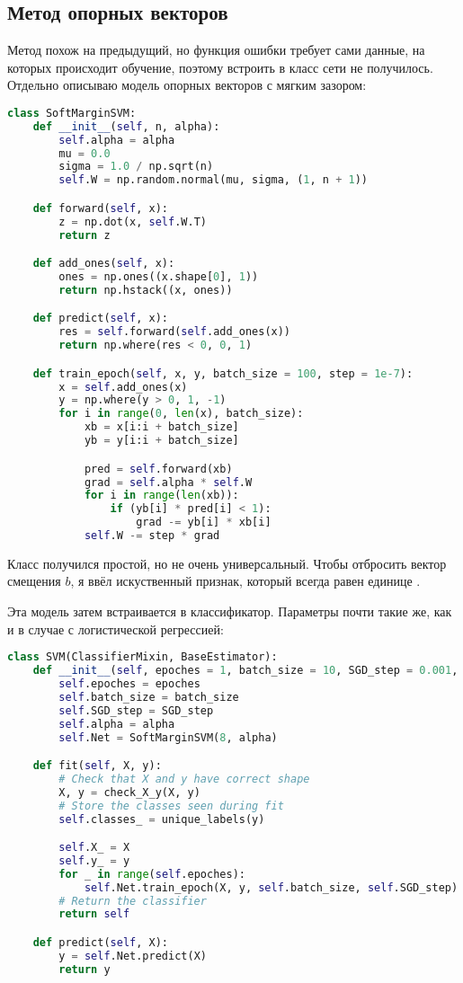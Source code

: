 \subsection{Метод опорных векторов}
Метод похож на предыдущий, но функция ошибки требует сами данные, на которых происходит обучение, поэтому встроить в класс сети не получилось. Отдельно описываю модель опорных векторов с мягким зазором:
\begin{lstlisting}[language=Python]
class SoftMarginSVM:
    def __init__(self, n, alpha):
        self.alpha = alpha
        mu = 0.0
        sigma = 1.0 / np.sqrt(n)
        self.W = np.random.normal(mu, sigma, (1, n + 1))

    def forward(self, x):
        z = np.dot(x, self.W.T)
        return z

    def add_ones(self, x):
        ones = np.ones((x.shape[0], 1))
        return np.hstack((x, ones))

    def predict(self, x):
        res = self.forward(self.add_ones(x))
        return np.where(res < 0, 0, 1)

    def train_epoch(self, x, y, batch_size = 100, step = 1e-7):
        x = self.add_ones(x)
        y = np.where(y > 0, 1, -1)
        for i in range(0, len(x), batch_size):
            xb = x[i:i + batch_size]
            yb = y[i:i + batch_size]

            pred = self.forward(xb)
            grad = self.alpha * self.W
            for i in range(len(xb)):
                if (yb[i] * pred[i] < 1):
                    grad -= yb[i] * xb[i]
            self.W -= step * grad
\end{lstlisting}
Класс получился простой, но не очень универсальный. Чтобы отбросить вектор смещения $b$, я ввёл искуственный признак, который всегда равен единице \cite{habr-svm}.
\pagebreak

Эта модель затем встраивается в классификатор. Параметры почти такие же, как и в случае с логистической регрессией:
\begin{lstlisting}[language=Python]
class SVM(ClassifierMixin, BaseEstimator):
    def __init__(self, epoches = 1, batch_size = 10, SGD_step = 0.001, alpha = 0.1):
        self.epoches = epoches
        self.batch_size = batch_size
        self.SGD_step = SGD_step
        self.alpha = alpha
        self.Net = SoftMarginSVM(8, alpha)

    def fit(self, X, y):
        # Check that X and y have correct shape
        X, y = check_X_y(X, y)
        # Store the classes seen during fit
        self.classes_ = unique_labels(y)

        self.X_ = X
        self.y_ = y
        for _ in range(self.epoches):
            self.Net.train_epoch(X, y, self.batch_size, self.SGD_step)
        # Return the classifier
        return self

    def predict(self, X):
        y = self.Net.predict(X)
        return y
\end{lstlisting}
\pagebreak

